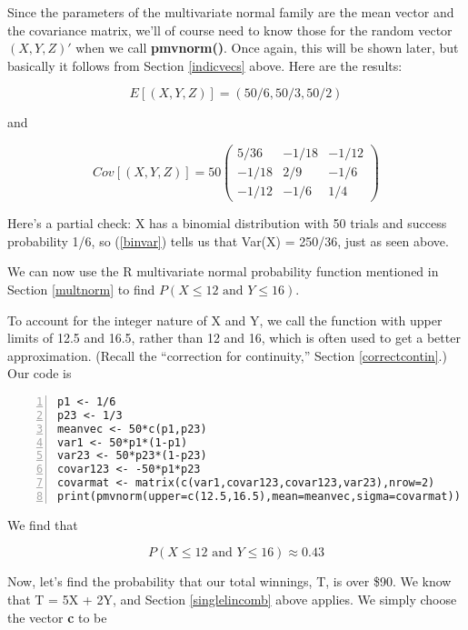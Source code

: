 Since the parameters of the multivariate normal family are the mean
vector and the covariance matrix, we'll of course need to know those for
the random vector $(X,Y,Z)'$ when we call {\bf pmvnorm()}.  Once again,
this will be shown later, but basically it follows from Section
\ref{indicvecs} above.  Here are the results:

\begin{equation}
E[(X,Y,Z)] = (50/6, 50/3, 50/2)
\end{equation}

and

\begin{equation}
Cov[(X,Y,Z)] =  
50
\begin{pmatrix}
5/36 & -1/18 & -1/12 \\
-1/18 & 2/9 & -1/6 \\
-1/12 & -1/6 & 1/4 
\end{pmatrix}
\end{equation}

Here's a partial check:  X has a binomial distribution with 50 trials
and success probability 1/6, so (\ref{binvar}) tells us that Var(X) =
250/36, just as seen above.

We can now use the R multivariate normal probability function mentioned
in Section \ref{multnorm} to find $P(X \leq 12 \textrm{ and } Y \leq
16)$.

To account for the integer nature of X and Y, we call the function with
upper limits of 12.5 and 16.5, rather than 12 and 16, which is often
used to get a better approximation.  (Recall the ``correction for
continuity,'' Section \ref{correctcontin}.) Our code is

\begin{Verbatim}[fontsize=\relsize{-2},numbers=left]
p1 <- 1/6
p23 <- 1/3
meanvec <- 50*c(p1,p23)
var1 <- 50*p1*(1-p1)
var23 <- 50*p23*(1-p23)
covar123 <- -50*p1*p23
covarmat <- matrix(c(var1,covar123,covar123,var23),nrow=2)
print(pmvnorm(upper=c(12.5,16.5),mean=meanvec,sigma=covarmat))
\end{Verbatim}

We find that 

\begin{equation}
P(X \leq 12 \textrm{ and } Y \leq 16) \approx 0.43
\end{equation}

Now, let's find the probability that our total winnings, T, is over
\$90.  We know that T = 5X + 2Y, and Section \ref{singlelincomb} above
applies.  We simply choose the vector {\bf c} to be

